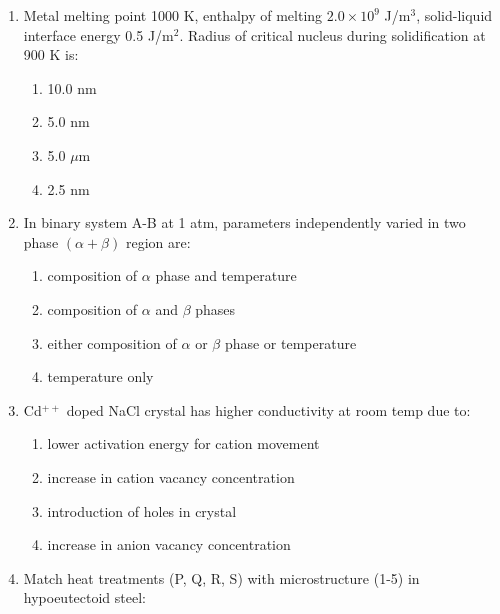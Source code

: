 \documentclass[journal,cmex10]{IEEEtran}
\theoremstyle{remark}
\numberwithin{equation}{enumi}
\numberwithin{figure}{enumi}
\begin{document}
\begin{enumerate}[label=\arabic*)]
\vspace{0.5cm}
\item Metal melting point 1000 K, enthalpy of melting $2.0 \times 10^9$ J/m$^3$, solid-liquid interface energy 0.5 J/m$^2$. Radius of critical nucleus during solidification at 900 K is:  
\hfill{}
\begin{enumerate}[label=\alph*)]
    \item 10.0 nm
    \item 5.0 nm
    \item 5.0 $\mu$m
    \item 2.5 nm
\end{enumerate}

\vspace{0.5cm}
\item  In binary system A-B at 1 atm, parameters independently varied in two phase $(\alpha+\beta)$ region are:  
\hfill{}
\begin{enumerate}[label=\alph*)]
    \item composition of $\alpha$ phase and temperature
    \item composition of $\alpha$ and $\beta$ phases
    \item either composition of $\alpha$ or $\beta$ phase or temperature
    \item temperature only
\end{enumerate}

\vspace{0.5cm}
\item Cd$^{++}$ doped NaCl crystal has higher conductivity at room temp due to:  
\vspace{0.2cm}
\hfill{}
\begin{enumerate}[label=\alph*)]
    \item lower activation energy for cation movement
    \item increase in cation vacancy concentration
    \item introduction of holes in crystal
    \item increase in anion vacancy concentration
\end{enumerate}

\newpage
\item Match heat treatments (P, Q, R, S) with microstructure (1-5) in hypoeutectoid steel: 
\vspace{0.5cm}
\hfill{}



\end{enumerate}
\end{document}
